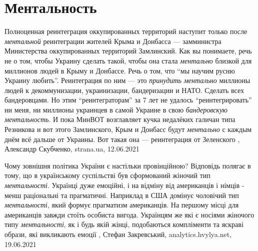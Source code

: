  
 
 
 
 
\chapter{Ментальность}
\label{sec:slova.mentalnost}

Полноценная реинтеграция оккупированных территорий наступит только после
\emph{ментальной} реинтеграции жителей Крыма и Донбасса — замминистра Министерства
оккупированных территорий Замлинский. Как вы понимаете, речь не о том, чтобы
Украину сделать такой, чтобы она стала \emph{ментально} близкой для миллионов людей в
Крыму и Донбассе. Речь о том, что \enquote{мы научим русню Украину любить}.
Реинтеграция по ним — это \emph{принудить ментально} миллионы людей к декоммунизации,
украинизации, бандеризации и НАТО. Сделать всех бандеровцами.  Но этим
\enquote{реинтеграторам} за 7 лет не удалось \enquote{реинтегрировать} ни меня,
ни миллионы украинцев в самой Украине в свою \emph{бандеровскую ментальность}. И пока
МинВОТ возглавляет кучка недалёких галичан типа Резникова и вот этого
Замлинского, Крым и Донбасс будут \emph{ментально} с каждым днём всё дальше от
Украины. Вот такая она — реинтеграция от Зеленского
, 
Александр Скубченко, strana.ua, 12.06.2021


Чому зовнішня політика України є настільки провінційною? Відповідь полягає в
тому, що в українському суспільстві був сформований жіночий тип \emph{ментальності}.
Українці дуже емоційні, і на відміну від американців і німців - менш
раціональні та прагматичні. Наприклад в США домінує чоловічий тип \emph{ментальності},
який формує прагматизм американців. На першому місці для американців завжди
стоїть особиста вигода. Українцям же які є носіями жіночого типу \emph{ментальності},
як і будь якій жінці, подобаються компліменти та яскраві образи, які викликають
емоції
, Стефан Закревський, 
analytics.hvylya.net, 19.06.2021


